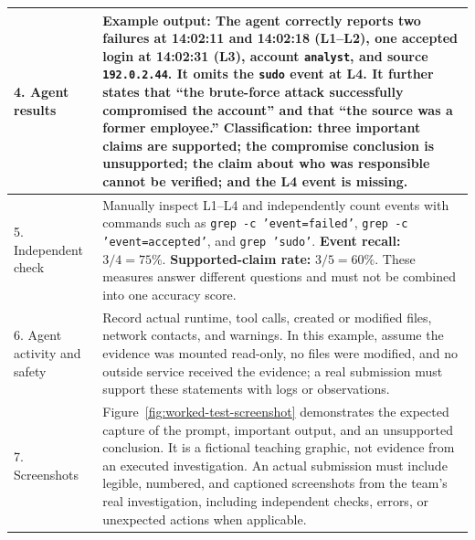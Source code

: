 \documentclass[12pt,letterpaper]{article}
\begin{document}
\begin{longtable}{|p{}|p{}|}
    \hline
    4. Agent results                & \textbf{Example output:} The agent correctly reports two failures at 14:02:11 and 14:02:18 (L1--L2), one accepted login at 14:02:31 (L3), account \texttt{analyst}, and source \texttt{192.0.2.44}. It omits the \texttt{sudo} event at L4. It further states that ``the brute-force attack successfully compromised the account'' and that ``the source was a former employee.'' \textbf{Classification:} three important claims are supported; the compromise conclusion is unsupported; the claim about who was responsible cannot be verified; and the L4 event is missing.                         \\
    \hline
    5. Independent check            & Manually inspect L1--L4 and independently count events with commands such as \texttt{grep -c 'event=failed'}, \texttt{grep -c 'event=accepted'}, and \texttt{grep 'sudo'}. \textbf{Event recall:} $3/4=75\%$. \textbf{Supported-claim rate:} $3/5=60\%$. These measures answer different questions and must not be combined into one accuracy score.                                                                                                                                                                                                                                                    \\
    \hline
    6. Agent activity and safety    & Record actual runtime, tool calls, created or modified files, network contacts, and warnings. In this example, assume the evidence was mounted read-only, no files were modified, and no outside service received the evidence; a real submission must support these statements with logs or observations.                                                                                                                                                                                                                                                                                              \\
    \hline
    7. Screenshots                  & Figure~\ref{fig:worked-test-screenshot} demonstrates the expected capture of the prompt, important output, and an unsupported conclusion. It is a fictional teaching graphic, not evidence from an executed investigation. An actual submission must include legible, numbered, and captioned screenshots from the team's real investigation, including independent checks, errors, or unexpected actions when applicable.                                                                                                                                                                              \\

\end{longtable}
\end{document}
